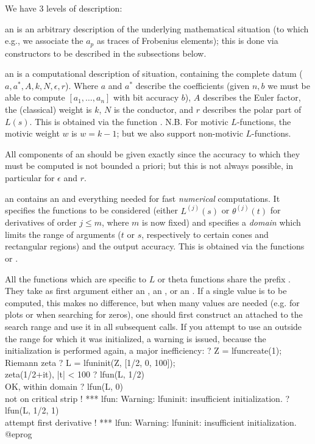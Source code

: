 We have 3 levels of description:

\item an  is an arbitrary description of the underlying
mathematical situation (to which e.g., we associate the $a_p$ as traces of
Frobenius elements); this is done via constructors to be described in the
subsections below.

\item an  is a computational description of situation, containing
the complete datum ($a,a^*,A,k,N,\epsilon,r$). Where $a$ and $a^*$ describe
the coefficients (given $n,b$ we must be able to compute $[a_1,\dots,a_n]$
with bit accuracy $b$), $A$ describes the Euler factor, the (classical) weight
is $k$, $N$ is the conductor, and $r$ describes the polar part of $L(s)$.
This is obtained via the function . N.B. For motivic
$L$-functions, the motivic weight $w$ is $w = k-1$; but we also support
non-motivic $L$-functions.

 All components of an  should be given
exactly since the accuracy to which they must be computed is not bounded a
priori; but this is not always possible, in particular for $\epsilon$ and $r$.

\item an  contains an  and everything needed for fast
\emph{numerical} computations. It specifies the functions to be considered
(either $L^{(j)}(s)$ or $\theta^{(j)}(t)$ for derivatives of order $j \leq
m$, where $m$ is now fixed) and specifies a \emph{domain} which limits
the range of arguments ($t$ or $s$, respectively to certain cones and
rectangular regions) and the output accuracy. This is obtained via the
functions  or .

All the functions which are specific to $L$ or theta functions share the
prefix . They take as first argument either an , an
, or an . If a single value is to be computed,
this makes no difference, but when many values are needed (e.g. for plots or
when searching for zeros), one should first construct an 
attached to the search range and use it in all subsequent calls.
If you attempt to use an  outside the range for which it was
initialized, a warning is issued, because the initialization is
performed again, a major inefficiency:
\bprog
? Z = lfuncreate(1); \\ Riemann zeta
? L = lfuninit(Z, [1/2, 0, 100]); \\ zeta(1/2+it), |t| < 100
? lfun(L, 1/2)    \\ OK, within domain
? lfun(L, 0)      \\ not on critical strip !
  *** lfun: Warning: lfuninit: insufficient initialization.
? lfun(L, 1/2, 1) \\ attempt first derivative !
*** lfun: Warning: lfuninit: insufficient initialization.
@eprog


